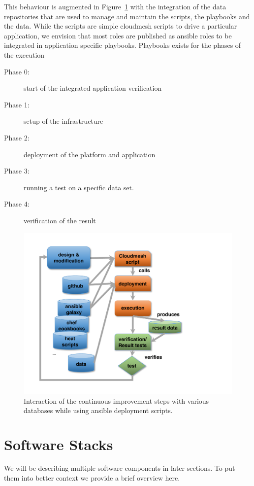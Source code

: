 \documentclass[9pt,twocolumn,twoside]{styles/osajnl}
\begin{document}
This behaviour is augmented in Figure~\ref{F:NIST-devops-2} with the integration of the
data repositories that are used to manage and maintain the scripts,
the playbooks and the data. While the scripts are simple cloudmesh
scripts to drive a particular application, we envision that most roles
are published as ansible roles to be integrated in application
specific playbooks. Playbooks exists for the phases of the execution

\begin{description}
\item[Phase 0:] start of the integrated application verification
\item[Phase 1:] setup of the infrastructure 
\item[Phase 2:] deployment of the platform and application
\item[Phase 3:] running a test on a specific data set.
\item[Phase 4:] verification of the result
\end{description}


\begin{figure}
  \centering
      \includegraphics[width=0.8\columnwidth]{images/nist-devops-2.pdf}
  \caption{Interaction of the continuous improvement steps with
    various databases while using ansible deployment scripts.}
  \label{F:NIST-devops-2}
\end{figure}


\section{Software Stacks}

We will be describing multiple software components in later
sections. To put them into better context we provide a brief overview
here.
\end{document}
